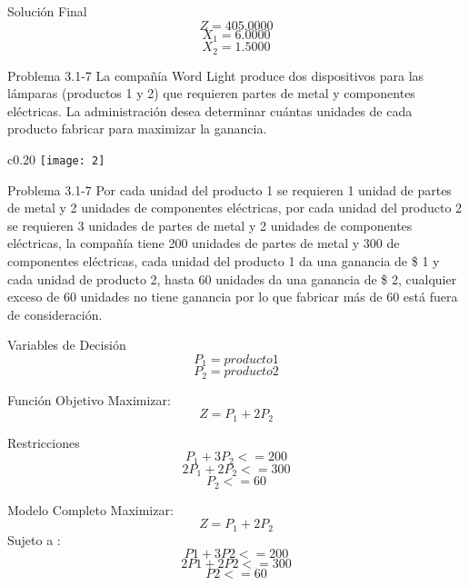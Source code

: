 \documentclass{beamer}
\begin{document}
\begin{frame}[fragile]{Solución Final}
\[Z = 405.0000\]
\[X_{1} = 6.0000\]
\[X_{2} = 1.5000\]
\end{frame}

\begin{frame}[t,fragile]{Problema 3.1-7 }
La compañía Word Light produce dos dispositivos para las lámparas (productos 1 y 2) que requieren partes de metal y componentes eléctricas. La administración desea determinar cuántas unidades de cada producto fabricar para maximizar la ganancia. 
\begin{wrapfigure}{c}{0.20\textwidth}
    \centering
    \texttt{[image: 2]}
\end{wrapfigure}
\end{frame}
\begin{frame}[t,fragile]{Problema 3.1-7 }
Por cada unidad del producto 1 se requieren 1 unidad de partes de metal y 2 unidades de componentes eléctricas, por cada unidad del producto 2 se requieren 3 unidades de partes de metal y 2 unidades de componentes eléctricas, la compañía tiene 200 unidades de partes de metal y 300 de componentes eléctricas, cada unidad del producto 1 da una ganancia de \$ 1 y cada unidad de producto 2, hasta 60 unidades da una ganancia de \$ 2, cualquier exceso de 60 unidades no tiene ganancia por lo que fabricar más de 60 está fuera de consideración. \\
\end{frame}

\begin{frame}[fragile]{Variables de Decisión}
\[P_{1} = producto 1\]
\[P_{2} = producto 2\]

\end{frame}

\begin{frame}[fragile]{Función Objetivo}
Maximizar:\\
\[Z = P_{1} + 2P_{2}\]

\end{frame}

\begin{frame}[fragile]{Restricciones}
\[P_{1} + 3P_{2}  <= 200\]
\[2P_{1} + 2P_{2} <= 300\]
\[P_{2} <= 60\]
\end{frame}

\begin{frame}[fragile]{Modelo Completo}
Maximizar:\\
\[Z = P_{1} + 2P_{2}\]
Sujeto a :\\
\[P1 + 3P2  <= 200\]
\[2P1 + 2P2 <= 300\]
\[P2 <= 60\]
\end{frame}
\end{document}
